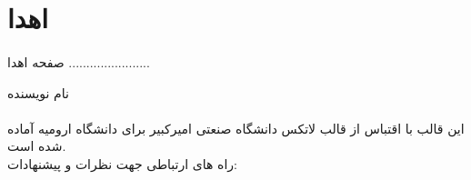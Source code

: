 
\section*{اهدا}

\paragraph*{}
صفحه اهدا .......................

\centerline{نام نویسنده}

\paragraph*{}

این قالب با اقتباس از قالب لاتکس دانشگاه صنعتی امیرکبیر برای دانشگاه ارومیه آماده شده است.
\\
راه های ارتباطی جهت نظرات و پیشنهادات:
\\
\begin{flushleft}
	\\
	\\
\end{flushleft}
